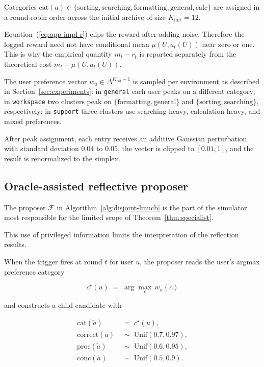 \documentclass{article} %
\renewcommand{\eqref}[1]{\textup{(\ref{#1})}}
\begin{document}
Categories $\mathrm{cat}(a) \in \{\text{sorting}, \text{searching}, \text{formatting}, \text{general}, \text{calc}\}$ are assigned in a round-robin order across the initial archive of size $K_{\text{init}} = 12$.

Equation~\eqref{eq:app-impl-r} clips the reward after adding noise. Therefore
the logged reward need not have conditional mean \(\mu(U,a_t(U))\) near zero or
one. This is why the empirical quantity \(m_t-r_t\) is reported separately
from the theoretical cost \(m_t-\mu(U,a_t(U))\).

The user preference vector \(w_u\in\Delta^{K_{\mathrm{cat}}-1}\) is sampled per
environment as described in Section~\ref{sec:experiments}: in
\texttt{general} each user peaks on a different category; in
\texttt{workspace} two clusters peak on
\(\{\text{formatting},\text{general}\}\) and
\(\{\text{sorting},\text{searching}\}\), respectively; in \texttt{support}
three clusters use searching-heavy, calculation-heavy, and mixed preferences.

After peak assignment, each entry receives an additive Gaussian perturbation with standard deviation $0.04$ to $0.05$, the vector is clipped to $[0.01, 1]$, and the result is renormalized to the simplex.

\subsection{Oracle-assisted reflective proposer}

\label{app:impl-reflection}

The proposer \(\mathcal F\) in Algorithm~\ref{alg:disjoint-linucb} is the part
of the simulator most responsible for the limited scope of
Theorem~\ref{thm:specialist}.

This use of privileged information limits the interpretation of the reflection results.

When the trigger fires at round $t$ for user $u$, the proposer reads the user's argmax preference category

\begin{equation}
\label{eq:app-impl-peak}
c^\star(u) \;=\; \arg\max_{c}\, w_u(c)
\end{equation}

and constructs a child candidate with

\begin{align}
\label{eq:app-impl-child-cat}
\mathrm{cat}(\tilde a) &\;=\; c^\star(u),\\
\label{eq:app-impl-child-q}
\mathrm{correct}(\tilde a) &\;\sim\; \mathrm{Unif}(0.7, 0.97),\\
\label{eq:app-impl-child-p}
\mathrm{proc}(\tilde a) &\;\sim\; \mathrm{Unif}(0.6, 0.95),\\
\label{eq:app-impl-child-c}
\mathrm{conc}(\tilde a) &\;\sim\; \mathrm{Unif}(0.5, 0.9).
\end{align}
\end{document}
